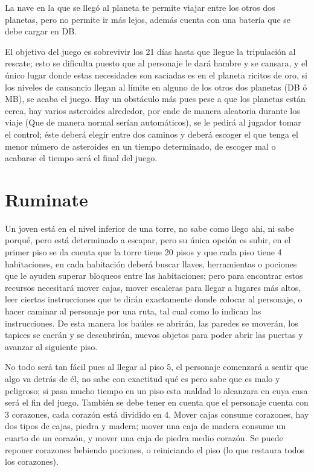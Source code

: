 \documentclass{article}
\begin{document}
La nave en la que se llegó al planeta te permite viajar entre los otros dos planetas, pero no permite ir más lejos, además cuenta con una batería que se debe cargar en DB.

El objetivo del juego es sobrevivir los 21 días hasta que llegue la tripulación al rescate; esto se dificulta puesto que al personaje le dará hambre y se cansara, y el único lugar donde estas necesidades son saciadas es en el planeta ricitos de oro, si los niveles de cansancio llegan al límite en alguno de los otros dos planetas (DB ó MB), se acaba el juego. Hay un obstáculo más pues pese a que los planetas están cerca, hay varios asteroides alrededor, por ende de manera aleatoria durante los viaje (Que de manera normal serían automáticos), se le pedirá al jugador tomar el control; éste deberá elegir entre dos caminos y deberá escoger el que tenga el menor número de asteroides en un tiempo determinado, de escoger mal o acabarse el tiempo será el final del juego.

\section{Ruminate}\label{intro}
Un joven está en el nivel inferior de una torre, no sabe como llego ahi, ni sabe porqué, pero está determinado a escapar, pero su única opción es subir, en el primer piso se da cuenta que la torre tiene 20 pisos y que cada piso tiene 4 habitaciones, en cada habitación deberá buscar llaves, herramientas o pociones que le ayuden superar bloqueos entre las habitaciones; pero para encontrar estos recursos necesitará mover cajas, mover escaleras para llegar a lugares más altos, leer ciertas instrucciones que te dirán exactamente donde colocar al personaje, o hacer caminar al personaje por una ruta, tal cual como lo indican las instrucciones. De esta manera los baúles se abrirán, las paredes se moverán, los tapices se caerán y se descubrirán, nuevos objetos para poder abrir las puertas y avanzar al siguiente piso.
    
No todo será tan fácil pues al llegar al piso 5, el personaje comenzará a sentir que algo va detrás de él, no sabe con exactitud qué es pero sabe que es malo y peligroso; si pasa mucho tiempo en un piso esta maldad lo alcanzara en cuya casa será el fin del juego. También se debe tener en cuenta que el personaje cuenta con 3 corazones, cada corazón está dividido en 4. Mover cajas consume corazones, hay dos tipos de cajas, piedra y madera; mover una caja de madera consume un cuarto de un corazón, y mover una caja de piedra medio corazón. Se puede reponer corazones bebiendo pociones, o reiniciando el piso (lo que restaura todos los corazones).
\end{document}
